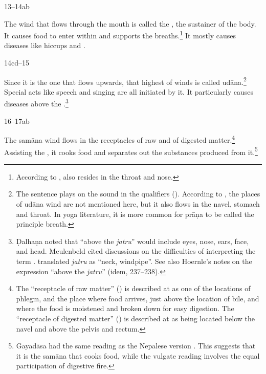 \begin{translation}
\item[13--14ab] 

	The wind that flows through the mouth is called the , the sustainer of the body.  It causes food to enter within and
	supports the breaths.\footnote{According to
	,  also resides in the throat and
	nose.} It mostly causes diseases like hiccups and .



\item[14cd--15] 

Since it is the one that flows upwards, that highest of winds is
called udāna.\footnote{The sentence plays on the sound
     in the qualifiers ().  According to , the places of
    udāna wind are not mentioned here, but it also flows in the navel,
    stomach and throat. In yoga literature, it is more common for prāṇa to
    be called the principle breath.} Special acts like speech and singing
    are all initiated by it. It particularly causes diseases above the
    .\footnote{Ḍalhaṇa noted that “above the \emph{jatru}”
        would include eyes, nose, ears, face, and head. Meulenbeld cited
        discussions on the difficulties of interpreting the term 
        \citep[465]{meul-1974}.  \citet[\S\S62, 98]{hoer-1907} translated
        \emph{jatru} as “neck, windpipe”. See also Hoernle's notes on the
        expression “above the \emph{jatru}” (idem, 237--238).}

\item [16--17ab]

	The samāna wind flows in the receptacles of raw and of digested
	matter.\footnote{The “receptacle of raw matter” () is
	described at  as one of the locations of phlegm, and
	 the place where food arrives, just above the location of bile, and
	 where the food is moistened and broken down for easy digestion.  The
	“receptacle of digested matter” () is described at
	 as being located below the navel and above the pelvis
	and rectum.} Assisting the , it cooks food and
	 separates out the substances produced from it.\footnote{Gayadāsa had
	 the same reading  as the Nepalese version \citep[260,
	 note~1 and the text of the \emph{Nyācacandrikā}]{vulgate}.  This
	 suggests that it is the samāna that cooks food, while the vulgate
	 reading involves the equal participation of digestive fire.}


\end{translation}
